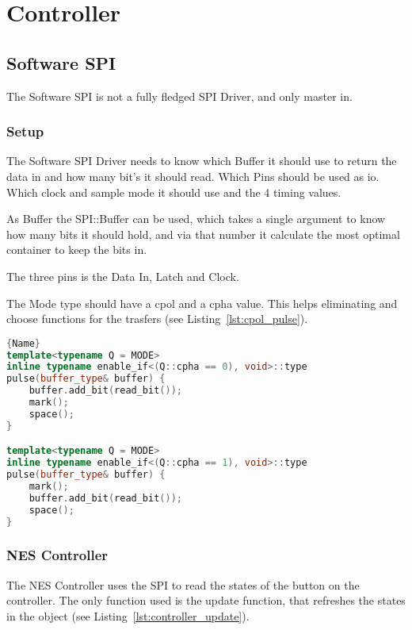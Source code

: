 \section{Controller}

\subsection{Software SPI}

The Software SPI is not a fully fledged SPI Driver, and only master in.

\subsubsection{Setup}

The Software SPI Driver needs to know which Buffer it should use to return the data in and how many bit's it should read. Which Pins should be used as io. Which clock and sample mode it should use and the 4 timing values.

As Buffer the SPI::Buffer can be used, which takes a single argument to know how many bits it should hold, and via that number it calculate the most optimal container to keep the bits in.

The three pins is the Data In, Latch and Clock.

The Mode type should have a cpol and a cpha value. This helps eliminating and choose functions for the trasfers (see Listing~\ref{lst:cpol_pulse}).

\begin{lstlisting}[caption={CPOL Determines when to sample},label={lst:cpol_pulse},frame=tlrb, language=C++]{Name}
template<typename Q = MODE>
inline typename enable_if<(Q::cpha == 0), void>::type
pulse(buffer_type& buffer) {
    buffer.add_bit(read_bit());
  	mark();
  	space();
}

template<typename Q = MODE>
inline typename enable_if<(Q::cpha == 1), void>::type
pulse(buffer_type& buffer) {
    mark();
  	buffer.add_bit(read_bit());
  	space();
}
\end{lstlisting}

\subsubsection{NES Controller}

The NES Controller uses the SPI to read the states of the button on the controller. The only function used is the update function, that refreshes the states in the object (see Listing~\ref{lst:controller_update}).

